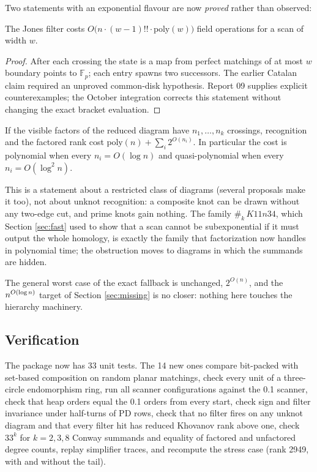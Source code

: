 Two statements with an exponential flavour are now \emph{proved} rather than
observed:
\begin{proposition}
The Jones filter costs $O\bigl(n\cdot(w-1)!!\cdot\mathrm{poly}(w)\bigr)$
field operations for a scan of width $w$.
\end{proposition}
\begin{proof}
After each crossing the state is a map from perfect matchings of at most
$w$ boundary points to $\mathbb F_p$; each entry spawns two successors.
The earlier Catalan claim required an unproved common-disk hypothesis.
Report 09 supplies explicit counterexamples; the October integration corrects
this statement without changing the exact bracket evaluation.
\end{proof}
\begin{proposition}
If the visible factors of the reduced diagram have $n_1,\dots,n_k$ crossings,
recognition and the factored rank cost $\mathrm{poly}(n)+\sum_i2^{O(n_i)}$.
In particular the cost is polynomial when every $n_i=O(\log n)$ and
quasi-polynomial when every $n_i=O(\log^2n)$.
\end{proposition}
This is a statement about a restricted class of diagrams (several proposals
make it too), not about unknot recognition: a composite knot can be drawn
without any two-edge cut, and prime knots gain nothing. The family
$\#_k\,K11n34$, which Section \ref{sec:fast} used to show that a scan cannot be
subexponential if it must output the whole homology, is exactly the family
that factorization now handles in polynomial time; the obstruction moves to
diagrams in which the summands are hidden.

The general worst case of the exact fallback is unchanged, $2^{O(n)}$, and the
$n^{O(\log n)}$ target of Section \ref{sec:missing} is no closer: nothing here touches
the hierarchy machinery.

\subsection{Verification}
The package now has 33 unit tests. The 14 new ones compare bit-packed with
set-based composition on random planar matchings, check every unit of a
three-circle endomorphism ring, run all scanner configurations against the 0.1
scanner, check that heap orders equal the 0.1 orders from every start, check
sign and filter invariance under half-turns of PD rows, check that no filter
fires on any unknot diagram and that every filter hit has reduced Khovanov
rank above one, check $33^k$ for $k=2,3,8$ Conway summands and equality of
factored and unfactored degree counts, replay simplifier traces, and
recompute the stress case (rank 2949, with and without the tail).

